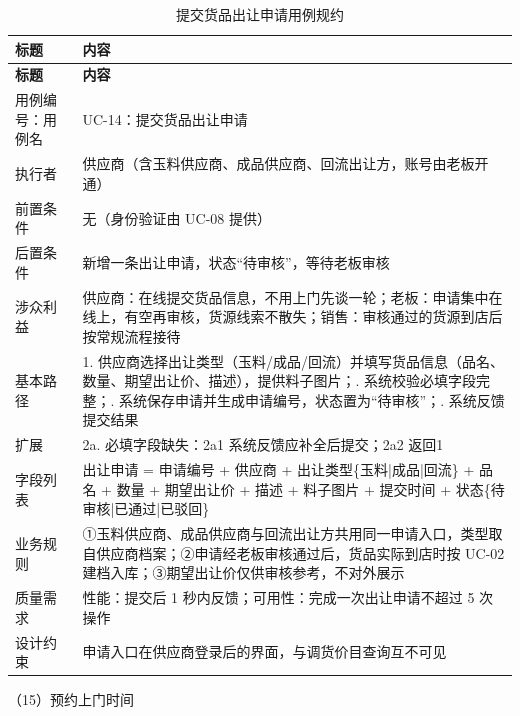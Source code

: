 \documentclass[12pt, a4paper]{ctexart}
\begin{document}
{\small
\begin{longtable}{@{}p{2.4cm} p{12.9cm}@{}}
\caption{提交货品出让申请用例规约}\label{tab:uc-14}\\
\toprule
\textbf{标题} & \textbf{内容} \\
\midrule
\endfirsthead
\toprule
\textbf{标题} & \textbf{内容} \\
\midrule
\endhead
用例编号：用例名 & UC-14：提交货品出让申请 \\
\midrule
执行者 & 供应商（含玉料供应商、成品供应商、回流出让方，账号由老板开通） \\
\midrule
前置条件 & 无（身份验证由 UC-08 提供） \\
\midrule
后置条件 & 新增一条出让申请，状态“待审核”，等待老板审核 \\
\midrule
涉众利益 & 供应商：在线提交货品信息，不用上门先谈一轮；\newline 老板：申请集中在线上，有空再审核，货源线索不散失；\newline 销售：审核通过的货源到店后按常规流程接待 \\
\midrule
基本路径 & 1. 供应商选择出让类型（玉料/成品/回流）并填写货品信息（品名、数量、期望出让价、描述），提供料子图片；\newline 2. 系统校验必填字段完整；\newline 3. 系统保存申请并生成申请编号，状态置为“待审核”；\newline 4. 系统反馈提交结果 \\
\midrule
扩展 & 2a. 必填字段缺失：2a1 系统反馈应补全后提交；2a2 返回1 \\
\midrule
字段列表 & 出让申请 = 申请编号 + 供应商 + 出让类型\{玉料|成品|回流\} + 品名 + 数量 + 期望出让价 + 描述 + 料子图片 + 提交时间 + 状态\{待审核|已通过|已驳回\} \\
\midrule
业务规则 & ①玉料供应商、成品供应商与回流出让方共用同一申请入口，类型取自供应商档案；\newline ②申请经老板审核通过后，货品实际到店时按 UC-02 建档入库；\newline ③期望出让价仅供审核参考，不对外展示 \\
\midrule
质量需求 & 性能：提交后 1 秒内反馈；\newline 可用性：完成一次出让申请不超过 5 次操作 \\
\midrule
设计约束 & 申请入口在供应商登录后的界面，与调货价目查询互不可见 \\
\midrule
\bottomrule
\end{longtable}}
\noindent（15）预约上门时间
\end{document}
